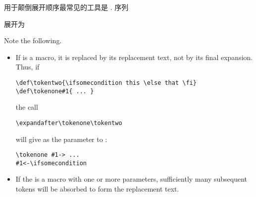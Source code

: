 \documentclass{book}
\begin{document}
用于颠倒展开顺序最常见的工具是
. 序列
\begin{disp}\end{disp}
展开为
\begin{disp}
\end{disp}
Note the following.
\begin{itemize} \item If  is a macro, it is replaced
by its replacement text, not by its final expansion.
Thus, if 
\begin{verbatim}
\def\tokentwo{\ifsomecondition this \else that \fi}
\def\tokenone#1{ ... }
\end{verbatim}
the call
\begin{verbatim}
\expandafter\tokenone\tokentwo
\end{verbatim}
will give  as the parameter
to :
\begin{verbatim}
\tokenone #1-> ...
#1<-\ifsomecondition
\end{verbatim}
\item If the  is a macro with one or more
parameters, sufficiently many subsequent tokens will be absorbed
to form the replacement text.\end{itemize}
\end{document}
